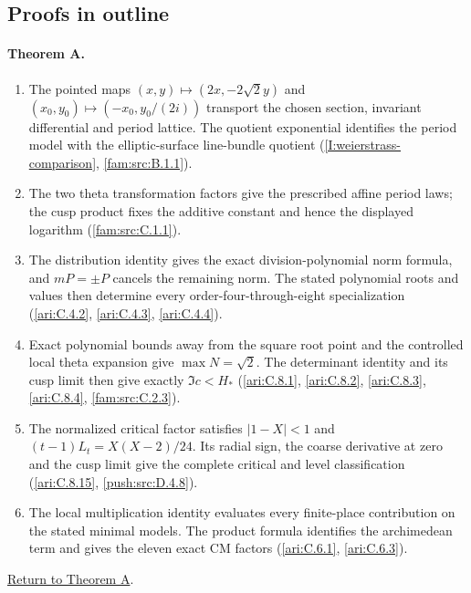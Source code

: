 \subsection{Proofs in outline}
\label{series:I:outlines}

\hypertarget{outline-I-A}{}
\paragraph{Theorem A.}
\begin{enumerate}[label=\arabic*.]
\item\hypertarget{step-I-A-1}{} The pointed maps
$(x,y)\mapsto(2x,-2\sqrt2y)$ and
$(x_0,y_0)\mapsto(-x_0,y_0/(2i))$ transport the chosen section,
invariant differential and period lattice.  The quotient
exponential identifies the period model with the elliptic-surface
line-bundle quotient
(\hyperref[I:weierstrass-comparison]{\ref*{I:weierstrass-comparison}},
\hyperref[fam:src:B.1.1]{\ref*{fam:src:B.1.1}}).
\item\hypertarget{step-I-A-2}{} The two theta transformation
factors give the prescribed affine period laws; the cusp product
fixes the additive constant and hence the displayed logarithm
(\hyperref[fam:src:C.1.1]{\ref*{fam:src:C.1.1}}).
\item\hypertarget{step-I-A-3}{} The distribution identity gives
the exact division-polynomial norm formula, and $mP=\pm P$
cancels the remaining norm.  The stated polynomial roots and
values then determine every order-four-through-eight
specialization
(\hyperref[ari:C.4.2]{\ref*{ari:C.4.2}},
\hyperref[ari:C.4.3]{\ref*{ari:C.4.3}},
\hyperref[ari:C.4.4]{\ref*{ari:C.4.4}}).
\item\hypertarget{step-I-A-4}{} Exact polynomial bounds away
from the square root point and the controlled local theta
expansion give $\max N=\sqrt2$.  The determinant identity and
its cusp limit then give exactly $\Im c<H_*$
(\hyperref[ari:C.8.1]{\ref*{ari:C.8.1}},
\hyperref[ari:C.8.2]{\ref*{ari:C.8.2}},
\hyperref[ari:C.8.3]{\ref*{ari:C.8.3}},
\hyperref[ari:C.8.4]{\ref*{ari:C.8.4}},
\hyperref[fam:src:C.2.3]{\ref*{fam:src:C.2.3}}).
\item\hypertarget{step-I-A-5}{} The normalized critical factor
satisfies $|1-X|<1$ and
$(t-1)L_t=X(X-2)/24$.  Its radial sign, the coarse derivative
at zero and the cusp limit give the complete critical and level
classification
(\hyperref[ari:C.8.15]{\ref*{ari:C.8.15}},
\hyperref[push:src:D.4.8]{\ref*{push:src:D.4.8}}).
\item\hypertarget{step-I-A-6}{} The local multiplication identity
evaluates every finite-place contribution on the stated minimal
models.  The product formula identifies the archimedean term and
gives the eleven exact CM factors
(\hyperref[ari:C.6.1]{\ref*{ari:C.6.1}},
\hyperref[ari:C.6.3]{\ref*{ari:C.6.3}}).
\end{enumerate}
\hyperlink{main-I-A}{Return to Theorem A}.

